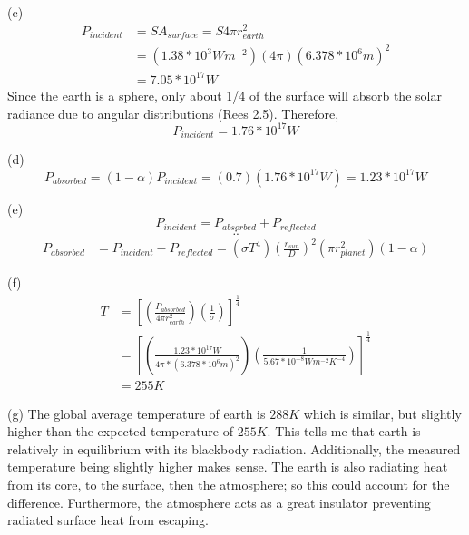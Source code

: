 \documentclass{homework}
\begin{document}
(c)
\begin{equation*}
    \begin{split}
        P_{incident} 
        & = SA_{surface} = S4 \pi r^2_{earth} \\
        & = (1.38*10^3 Wm^{-2})(4 \pi)(6.378*10^6 m)^2 \\
        & = 7.05*10^{17} W 
    \end{split}
\end{equation*}
Since the earth is a sphere, only about 1/4 of the surface will absorb the solar radiance due to angular distributions (Rees 2.5). Therefore, 
\begin{equation*}
    P_{incident} = 1.76*10^{17} W
\end{equation*}

(d) 
\begin{equation*}
    P_{absorbed} = (1-\alpha) P_{incident} = (0.7)(1.76*10^{17} W) = 1.23*10^{17} W
\end{equation*}

(e)
\begin{equation*} P_{incident} = P_{absorbed} + P_{reflected} \end{equation*}
\begin{equation*} \therefore \end{equation*}
\begin{equation*}
    \begin{split}
        P_{absorbed} 
            & = P_{incident} - P_{reflected} = (\sigma T^4) (\frac{r_{sun}}{D})^2 (\pi r^2_{planet})(1-\alpha)
    \end{split}
\end{equation*}

(f)
\begin{equation*}
    \begin{split}
        T 
            & =\left[ (\frac{P_{absorbed}}{4\pi r^2_{earth}})(\frac{1}{\sigma})             \right]^\frac{1}{4} \\
            & =\left[ (\frac{1.23*10^{17}W}{4\pi*(6.378*10^{6}m)^2})(\frac{1}{5.67*10^{-8} Wm^{-2}K^{-4}})             \right]^\frac{1}{4} \\
            & = 255 K
    \end{split}
\end{equation*}

(g)
The global average temperature of earth is $288K$ which is similar, but slightly higher than the expected temperature of $255K$. This tells me that earth is relatively in equilibrium with its blackbody radiation. Additionally, the measured temperature being slightly higher makes sense. The earth is also radiating heat from its core, to the surface, then the atmosphere; so this could account for the difference. Furthermore, the atmosphere acts as a great insulator preventing radiated surface heat from escaping.
\end{document}
